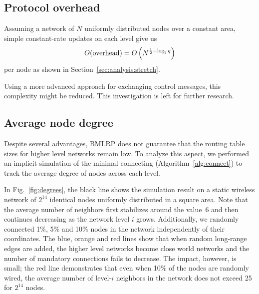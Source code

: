 \documentclass[conference]{IEEEtran}
\theoremstyle{definition}
\begin{document}
\subsection{Protocol overhead}
\label{sec:analysis:overhead}

Assuming a network of $N$ uniformly distributed nodes over a constant area, simple constant-rate updates on each level give us
%
\begin{equation*}
    O({\rm overhead}) = O \left ( N^{\frac{1}{2} + \log_2 q} \right )
\end{equation*}
%
per node as shown in Section~\ref{sec:analysis:stretch}.

Using a more advanced approach for exchanging control messages, this complexity might be reduced. This investigation is left for further research.


\subsection{Average node degree}
\label{sec:analysis:nodedegree}

Despite several advantages, BMLRP does not guarantee that the routing table sizes for higher level networks remain low. To analyze this aspect, we performed an implicit simulation of the minimal connecting 
(Algorithm~\ref{alg:connect}) to track the average degree of nodes across each level.

In Fig.~\ref{fig:degrees}, the black line shows the simulation result on a static wireless network of $2^{14}$ identical nodes uniformly distributed in a square area. Note that the average number of neighbors first stabilizes around 
the value~6 and then continues decreasing as the network level $i$ grows. Additionally, we randomly connected 1\%, 5\% and 10\% nodes in the network independently of their coordinates. The blue, orange and red lines show that when random long-range edges are added, the higher level networks become close world networks and the number of mandatory connections fails to decrease. The impact, however, is small; the red line demonstrates that even when 10\% of the nodes are randomly wired, the average number of level-$i$ neighbors in the network does not exceed 25 for $2^{14}$ nodes.
\end{document}
